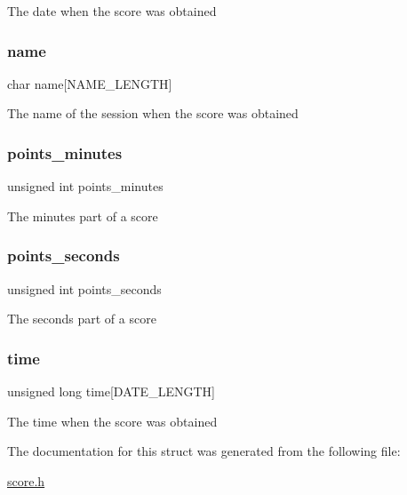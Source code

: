 The date when the score was obtained \hypertarget{struct_score_a89a88337d531d6b5590602d97b5df8c0}{}\label{struct_score_a89a88337d531d6b5590602d97b5df8c0} 
\subsubsection{\texorpdfstring{name}{name}}
{\footnotesize\ttfamily char name\mbox{[}N\+A\+M\+E\+\_\+\+L\+E\+N\+G\+TH\mbox{]}}

The name of the session when the score was obtained \hypertarget{struct_score_aa9526a2102bea713152f51e494eaaecb}{}\label{struct_score_aa9526a2102bea713152f51e494eaaecb} 
\subsubsection{\texorpdfstring{points\+\_\+minutes}{points\_minutes}}
{\footnotesize\ttfamily unsigned int points\+\_\+minutes}

The minutes part of a score \hypertarget{struct_score_a0eb13288839bf311a839235768f7e26c}{}\label{struct_score_a0eb13288839bf311a839235768f7e26c} 
\subsubsection{\texorpdfstring{points\+\_\+seconds}{points\_seconds}}
{\footnotesize\ttfamily unsigned int points\+\_\+seconds}

The seconds part of a score \hypertarget{struct_score_ae9f072d0deb7c6120bb575d62e5bc5c3}{}\label{struct_score_ae9f072d0deb7c6120bb575d62e5bc5c3} 
\subsubsection{\texorpdfstring{time}{time}}
{\footnotesize\ttfamily unsigned long time\mbox{[}D\+A\+T\+E\+\_\+\+L\+E\+N\+G\+TH\mbox{]}}

The time when the score was obtained 

The documentation for this struct was generated from the following file\+:\begin{DoxyCompactItemize}
\item 
\hyperlink{score_8h}{score.\+h}\end{DoxyCompactItemize}
